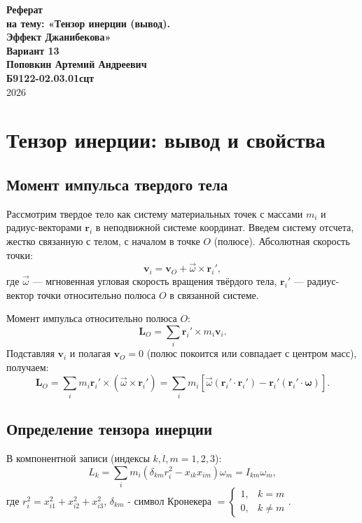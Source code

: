 \documentclass[12pt, a4paper]{article}
\begin{document}
\begin{titlepage}
    \begin{center}
        \vspace*{6cm}

        \textbf{\Huge Реферат}\\[0.5cm]
        \textbf{\Large на тему: «Тензор инерции (вывод).}\\[0.2cm]
        \textbf{\Large Эффект Джанибекова»}\\[1cm]
        \textbf{\Large Вариант 13}\\[3cm]        
        \textbf{\Large Поповкин Артемий Андреевич}\\[0.3cm]
        \textbf{\large Б9122-02.03.01сцт}\\[9cm]

        \textsc{\Large 2026}

        \vfill
    \end{center}
\end{titlepage}

\section{Тензор инерции: вывод и свойства}

\subsection{Момент импульса твердого тела}
Рассмотрим твердое тело как систему материальных точек с массами $m_i$ и радиус-векторами $\mathbf{r}_i$ в неподвижной системе координат. Введем систему отсчета, жестко связанную с телом, с началом в точке $O$ (полюсе). Абсолютная скорость точки:
\[
\mathbf{v}_i = \mathbf{v}_O + \vec{\omega} \times \mathbf{r}_i',
\]
где $\vec{\omega}$ — мгновенная угловая скорость вращения твёрдого тела, $\mathbf{r}_i'$ — радиус-вектор точки относительно полюса $O$ в связанной системе.

Момент импульса относительно полюса $O$:
\[
\mathbf{L}_O = \sum_i \mathbf{r}_i' \times m_i \mathbf{v}_i.
\]
Подставляя $\mathbf{v}_i$ и полагая $\mathbf{v}_O = 0$ (полюс покоится или совпадает с центром масс), получаем:
\[
\mathbf{L}_O = \sum_i m_i \mathbf{r}_i' \times (\vec{\omega} \times \mathbf{r}_i') = \sum_i m_i \left[ \vec{\omega} (\mathbf{r}_i' \cdot \mathbf{r}_i') - \mathbf{r}_i' (\mathbf{r}_i' \cdot \boldsymbol{\omega}) \right].
\]

\subsection{Определение тензора инерции}
В компонентной записи (индексы $k, l, m = 1,2,3$):
\[
L_k = \sum_i m_i \left( \delta_{km} r_i^2 - x_{ik} x_{im} \right) \omega_m = I_{km} \omega_m,
\]
где $r_i^2 = x_{i1}^2 + x_{i2}^2 + x_{i3}^2$, $\delta_{km}$ - символ Кронекера $ = \begin{cases}
    1, & k = m \\
    0, & k  \neq m
\end{cases}$.
\end{document}
